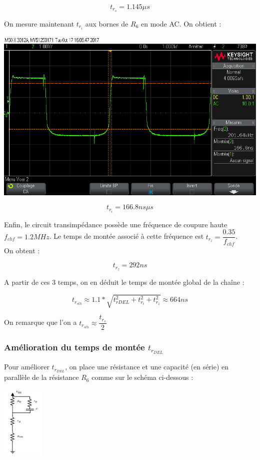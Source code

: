 \documentclass[a4paper]{report}
\begin{document}
$$t_{r_{s}} = 1.145 \mu s$$

On mesure maintenant $t_{r_{i}}$ aux bornes de $R_6$ en mode AC. On obtient :

\begin{center}
\includegraphics[width=1\textwidth]{tri_ac.png}
\end{center}

$$t_{r_{i}} = 166.8 ns \mu s$$

Enfin, le circuit transimpédance possède une fréquence de coupure haute $f_{chf} = 1.2MHz$. Le temps de montée associé à cette fréquence est $t_{r_{z}} = \dfrac{0.35}{f_{chf}}$.\\

On obtent :

$$t_{r_{z}} = 292ns$$

A partir de ces 3 temps, on en déduit le temps de montée global de la chaîne :

$$t_{r_{sth}} \approx 1.1*\sqrt{t_{rDEL}^2 + t_{r_{i}}^2 + t_{r_{z}}^2} \approx 664ns$$

On remarque que l'on a $t_{r_{sth}} \approx \dfrac{t_{r_{s}}}{2}$

\subsubsection{Amélioration du temps de montée $t_{r_{DEL}}$}

Pour améliorer $t_{r_{DEL}}$, on place une résistance et une capacité (en série) en parallèle de la résistance $R_6$ comme sur le schéma ci-dessous :

\begin{center}
\includegraphics[width=0.15\textwidth]{montage_amelio_trdel.PNG}
\end{center}
\end{document}

